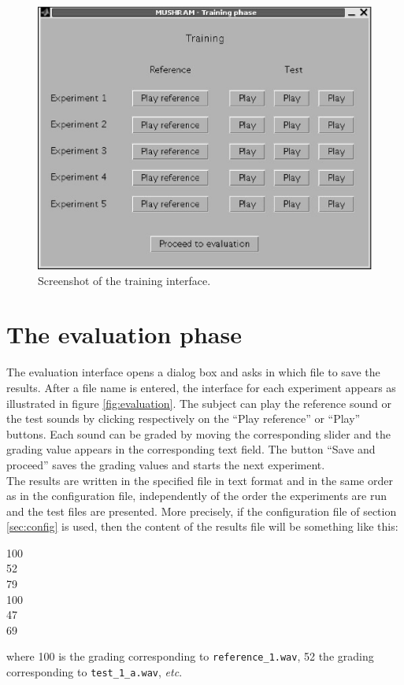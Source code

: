 \documentclass[11pt,a4paper]{book}
\begin{document}
\begin{figure}[htbp]
\centering
\includegraphics[scale=0.75]{training_screenshot.eps}
\caption{Screenshot of the training interface.}
\label{fig:training}
\end{figure}

\section{The evaluation phase}
The evaluation interface opens a dialog box and asks in which file to save the results. After a file name is entered, the interface for each experiment appears as illustrated in figure \ref{fig:evaluation}. The subject can play the reference sound or the test sounds by clicking respectively on the ``Play reference'' or ``Play'' buttons. Each sound can be graded by moving the corresponding slider and the grading value appears in the corresponding text field. The button ``Save and proceed'' saves the grading values and starts the next experiment.\\

The results are written in the specified file in text format and in the same order as in the configuration file, independently of the order the experiments are run and the test files are presented. More precisely, if the configuration file of section \ref{sec:config} is used, then the content of the results file will be something like this:\\[.5em]
\begin{tt}
100\\
52\\
79\\[1em]
100\\
47\\
69\\[.5em]
\end{tt}
where 100 is the grading corresponding to \texttt{reference\_1.wav}, 52 the grading corresponding to \texttt{test\_1\_a.wav}, \textit{etc}.
\end{document}
